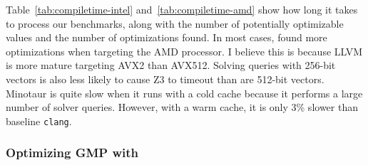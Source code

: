Table~\ref{tab:compiletime-intel} and~\ref{tab:compiletime-amd} show
how long it takes \minotaur{} to process our benchmarks, along with
the number of potentially optimizable values and the number of
optimizations found.
%
In most cases, \minotaur{} found more optimizations when targeting the AMD
processor.
%
I believe this is because LLVM is more mature targeting
AVX2 than AVX512.
%
Solving queries with 256-bit vectors is also less likely to cause Z3
to timeout than are 512-bit vectors.
%
Minotaur is quite slow when it runs with a cold cache because it
performs a large number of solver queries.
%
However, with a warm cache, it is only 3\% slower than baseline \texttt{clang}.



\subsubsection{Optimizing GMP with \minotaur{}}

